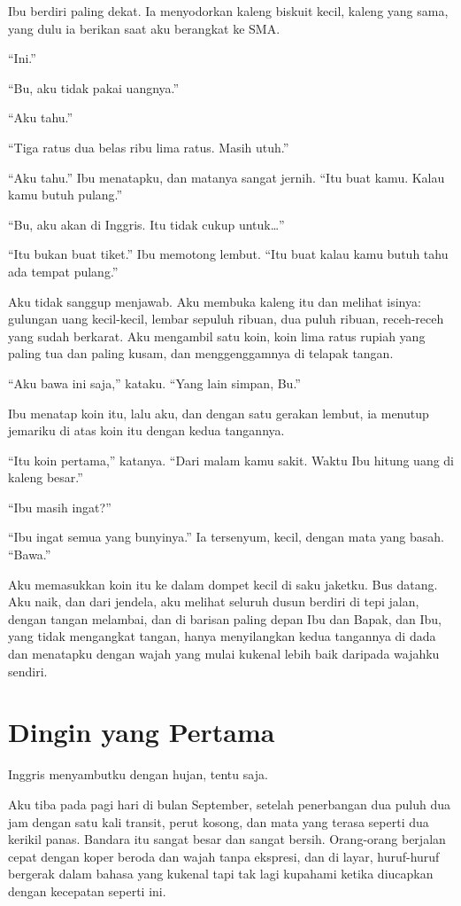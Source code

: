 \documentclass[11pt,twoside,openany]{book}
\begin{document}
Ibu berdiri paling dekat. Ia menyodorkan kaleng biskuit kecil, kaleng yang sama, yang dulu ia berikan saat aku berangkat ke SMA.

``Ini.''

``Bu, aku tidak pakai uangnya.''

``Aku tahu.''

``Tiga ratus dua belas ribu lima ratus. Masih utuh.''

``Aku tahu.'' Ibu menatapku, dan matanya sangat jernih. ``Itu buat kamu. Kalau kamu butuh pulang.''

``Bu, aku akan di Inggris. Itu tidak cukup untuk\ldots{}''

``Itu bukan buat tiket.'' Ibu memotong lembut. ``Itu buat kalau kamu butuh tahu ada tempat pulang.''

Aku tidak sanggup menjawab. Aku membuka kaleng itu dan melihat isinya: gulungan uang kecil-kecil, lembar sepuluh ribuan, dua puluh ribuan, receh-receh yang sudah berkarat. Aku mengambil satu koin, koin lima ratus rupiah yang paling tua dan paling kusam, dan menggenggamnya di telapak tangan.

``Aku bawa ini saja,'' kataku. ``Yang lain simpan, Bu.''

Ibu menatap koin itu, lalu aku, dan dengan satu gerakan lembut, ia menutup jemariku di atas koin itu dengan kedua tangannya.

``Itu koin pertama,'' katanya. ``Dari malam kamu sakit. Waktu Ibu hitung uang di kaleng besar.''

``Ibu masih ingat?''

``Ibu ingat semua yang bunyinya.'' Ia tersenyum, kecil, dengan mata yang basah. ``Bawa.''

Aku memasukkan koin itu ke dalam dompet kecil di saku jaketku. Bus datang. Aku naik, dan dari jendela, aku melihat seluruh dusun berdiri di tepi jalan, dengan tangan melambai, dan di barisan paling depan Ibu dan Bapak, dan Ibu, yang tidak mengangkat tangan, hanya menyilangkan kedua tangannya di dada dan menatapku dengan wajah yang mulai kukenal lebih baik daripada wajahku sendiri.

\chapter{Dingin yang Pertama}
Inggris menyambutku dengan hujan, tentu saja.

Aku tiba pada pagi hari di bulan September, setelah penerbangan dua puluh dua jam dengan satu kali transit, perut kosong, dan mata yang terasa seperti dua kerikil panas. Bandara itu sangat besar dan sangat bersih. Orang-orang berjalan cepat dengan koper beroda dan wajah tanpa ekspresi, dan di layar, huruf-huruf bergerak dalam bahasa yang kukenal tapi tak lagi kupahami ketika diucapkan dengan kecepatan seperti ini.
\end{document}
